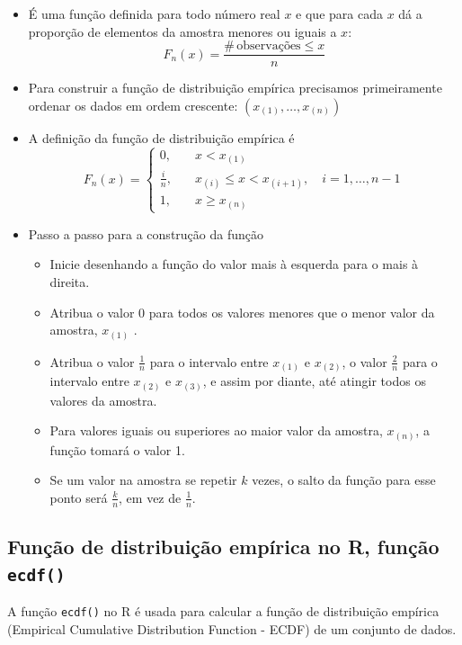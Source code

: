 \documentclass[
]{book}
\providecommand{\tightlist}{%
  \setlength{\itemsep}{0pt}\setlength{\parskip}{0pt}}
\theoremstyle{definition}
\theoremstyle{definition}
\theoremstyle{definition}
\theoremstyle{definition}
\theoremstyle{remark}
\begin{document}
\begin{itemize}
\item
  É uma função definida para todo número real \(x\) e que para cada \(x\) dá a proporção de elementos da amostra menores ou iguais a \(x\):
  \[F_{n}(x) = \frac{\# \, \text{observações} \leq x}{n}\]
\item
  Para construir a função de distribuição empírica precisamos primeiramente ordenar os dados em ordem crescente: \((x_{(1)},\ldots,x_{(n)})\)
\item
  A definição da função de distribuição empírica é
  \[F_{n}(x) = \begin{cases}
    0, & \quad x < x_{(1)} \\
    \frac{i}{n}, & \quad x_{(i)}\leq x < x_{(i+1)}, \quad i=1,\ldots,n-1 \\
    1, & \quad x\geq x_{(n)}
  \end{cases}\]
\item
  Passo a passo para a construção da função

  \begin{itemize}
  \tightlist
  \item
    Inicie desenhando a função do valor mais à esquerda para o mais à direita.
  \item
    Atribua o valor 0 para todos os valores menores que o menor valor da amostra, \(x_{(1)}\) .
  \item
    Atribua o valor \(\frac{1}{n}\) para o intervalo entre \(x_{(1)}\) e \(x_{(2)}\), o valor \(\frac{2}{n}\) para o intervalo entre \(x_{(2)}\) e \(x_{(3)}\), e assim por diante, até atingir todos os valores da amostra.
  \item
    Para valores iguais ou superiores ao maior valor da amostra, \(x_{(n)}\), a função tomará o valor 1.
  \item
    Se um valor na amostra se repetir \(k\) vezes, o salto da função para esse ponto será \(\frac{k}{n}\), em vez de \(\frac{1}{n}\).
  \end{itemize}
\end{itemize}

\subsection{\texorpdfstring{Função de distribuição empírica no R, função \texttt{ecdf()}}{Função de distribuição empírica no R, função ecdf()}}\label{funuxe7uxe3o-de-distribuiuxe7uxe3o-empuxedrica-no-r-funuxe7uxe3o-ecdf}

A função \texttt{ecdf()} no R é usada para calcular a função de distribuição empírica (Empirical Cumulative Distribution Function - ECDF) de um conjunto de dados.
\end{document}
